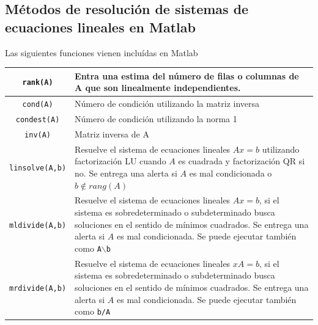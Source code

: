 \documentclass[11pt]{article}
\begin{document}
\subsection{M\'etodos de resoluci\'on de sistemas de ecuaciones lineales en Matlab}

Las siguientes funciones vienen inclu\'idas en Matlab

\begin{longtable}{||c|p{}||}
\hline
\texttt{rank(A)}	& 	Entra una estima del n\'umero de filas o columnas de A que son linealmente independientes.\\
\hline
\texttt{cond(A)}	&	N\'umero de condici\'on utilizando la matriz inversa \\
\hline
\texttt{condest(A)}	& 	N\'umero de condici\'on utilizando la norma 1\\
\hline
\texttt{inv(A)}		& 	Matriz inversa de A\\
\hline
\texttt{linsolve(A,b)} & Resuelve el sistema de ecuaciones lineales $Ax=b$  utilizando factorizaci\'on LU cuando $A$ es cuadrada y  factorizaci\'on QR si no. Se entrega una alerta si $A$ es mal condicionada o $b\notin rang(A)$\\
\hline
\texttt{mldivide(A,b)} & Resuelve el sistema de ecuaciones lineales $Ax=b$, si el sistema es sobredeterminado o subdeterminado busca soluciones en el sentido de m\'inimos cuadrados. Se entrega una alerta si $A$ es mal condicionada. Se puede ejecutar tambi\'en como \texttt{A$\backslash$b}\\
\hline
\texttt{mrdivide(A,b)} & Resuelve el sistema de ecuaciones lineales $xA=b$, si el sistema es sobredeterminado o subdeterminado busca soluciones en el sentido de m\'inimos cuadrados. Se entrega una alerta si $A$ es mal condicionada. Se puede ejecutar tambi\'en como \texttt{b/A}\\
\hline
\end{longtable}
\end{document}
